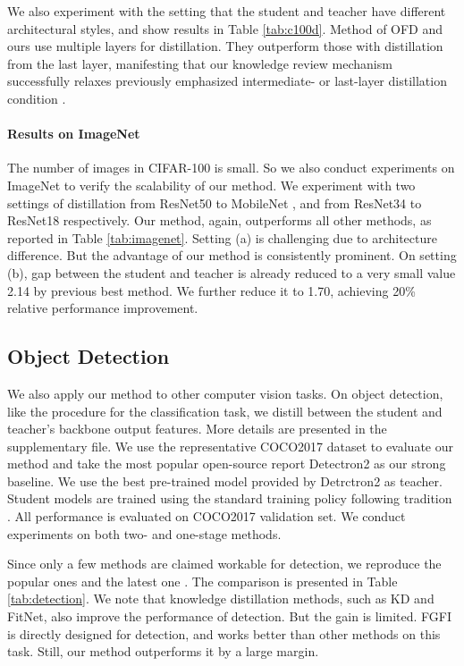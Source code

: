 \documentclass[final]{cvpr}
\begin{document}
We also experiment with the setting that the student and teacher have different architectural styles, and show results in Table \ref{tab:c100d}.
Method of OFD \cite{ofd} and ours use multiple layers for distillation. They outperform those with distillation from the last layer, manifesting that our knowledge review mechanism successfully relaxes previously emphasized intermediate- or last-layer distillation condition \cite{crd}. 

\vspace{-0.1in} \paragraph{Results on ImageNet} The number of images in CIFAR-100 is small. So we also conduct experiments on ImageNet to verify the scalability of our method. We
experiment with two settings of distillation from ResNet50 to MobileNet \cite{mobilenet}, and from ResNet34 to ResNet18  respectively. Our method, again, outperforms all other methods, as reported in Table \ref{tab:imagenet}. Setting (a) is challenging due to architecture difference. But the advantage of our method is consistently prominent. On setting (b), gap between the student and teacher is already reduced to a very small value 2.14 by previous best method. We further reduce it to 1.70, achieving 20\% relative performance improvement. 


\subsection{Object Detection}
We also apply our method to other computer vision tasks. On object detection, like the procedure for the classification task, we distill between the student and teacher's backbone output features. More details are presented in the supplementary file. We use the representative COCO2017 dataset \cite{coco} to evaluate our method and take the most popular open-source report Detectron2 \cite{wu2019detectron2} as our strong baseline. We use the best pre-trained model provided by Detrctron2 as teacher. Student models are trained using the standard training policy following tradition \cite{finegrained}. All performance is evaluated on COCO2017 validation set. We conduct experiments on both two- and one-stage methods.



Since only a few methods \cite{finegrained,ofd} are claimed workable for detection, we reproduce the popular ones \cite{kd,fitnet} and the latest one \cite{finegrained}. The comparison is presented in Table \ref{tab:detection}. We note that knowledge distillation methods, such as KD and FitNet, also improve the performance of detection. But the gain is limited. FGFI \cite{finegrained} is directly designed for detection, and works better than other methods on this task. Still, our method outperforms it by a large margin. 
\end{document}
